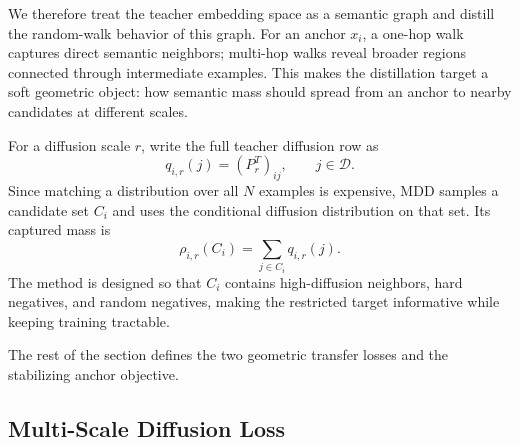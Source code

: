 We therefore treat the teacher embedding space as a semantic graph and distill the random-walk behavior of this graph. For an anchor $x_i$, a one-hop walk captures direct semantic neighbors; multi-hop walks reveal broader regions connected through intermediate examples. This makes the distillation target a soft geometric object: how semantic mass should spread from an anchor to nearby candidates at different scales.

For a diffusion scale $r$, write the full teacher diffusion row as
\begin{equation}
    q_{i,r}(j) = (P_r^T)_{ij}, \qquad j\in\mathcal{D}.
\end{equation}
Since matching a distribution over all $N$ examples is expensive, MDD samples a candidate set $C_i$ and uses the conditional diffusion distribution on that set. Its captured mass is
\begin{equation}
    \rho_{i,r}(C_i)=\sum_{j\in C_i}q_{i,r}(j).
\end{equation}
The method is designed so that $C_i$ contains high-diffusion neighbors, hard negatives, and random negatives, making the restricted target informative while keeping training tractable.

The rest of the section defines the two geometric transfer losses and the stabilizing anchor objective.

\subsection{Multi-Scale Diffusion Loss}

